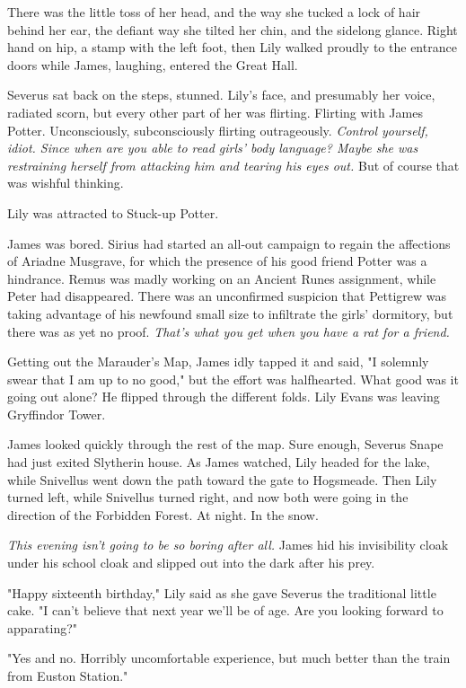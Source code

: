 \documentclass[a4paper,11pt]{article}
\begin{document}
There was the little toss of her head, and the way she tucked a lock of hair behind her ear, the defiant way she tilted her chin, and the sidelong glance. Right hand on hip, a stamp with the left foot, then Lily walked proudly to the entrance doors while James, laughing, entered the Great Hall.

Severus sat back on the steps, stunned. Lily's face, and presumably her voice, radiated scorn, but every other part of her was flirting. Flirting with James Potter. Unconsciously, subconsciously flirting outrageously. \emph{Control yourself, idiot. Since when are you able to read girls' body language? Maybe she was restraining herself from attacking him and tearing his eyes out.} But of course that was wishful thinking.

Lily was attracted to Stuck-up Potter.

James was bored. Sirius had started an all-out campaign to regain the affections of Ariadne Musgrave, for which the presence of his good friend Potter was a hindrance. Remus was madly working on an Ancient Runes assignment, while Peter had disappeared. There was an unconfirmed suspicion that Pettigrew was taking advantage of his newfound small size to infiltrate the girls' dormitory, but there was as yet no proof. \emph{That's what you get when you have a rat for a friend.}

Getting out the Marauder's Map, James idly tapped it and said, "I solemnly swear that I am up to no good," but the effort was halfhearted. What good was it going out alone? He flipped through the different folds. Lily Evans was leaving Gryffindor Tower.

James looked quickly through the rest of the map. Sure enough, Severus Snape had just exited Slytherin house. As James watched, Lily headed for the lake, while Snivellus went down the path toward the gate to Hogsmeade. Then Lily turned left, while Snivellus turned right, and now both were going in the direction of the Forbidden Forest. At night. In the snow.

\emph{This evening isn't going to be so boring after all.} James hid his invisibility cloak under his school cloak and slipped out into the dark after his prey.

"Happy sixteenth birthday," Lily said as she gave Severus the traditional little cake. "I can't believe that next year we'll be of age. Are you looking forward to apparating?"

"Yes and no. Horribly uncomfortable experience, but much better than the train from Euston Station."
\end{document}
